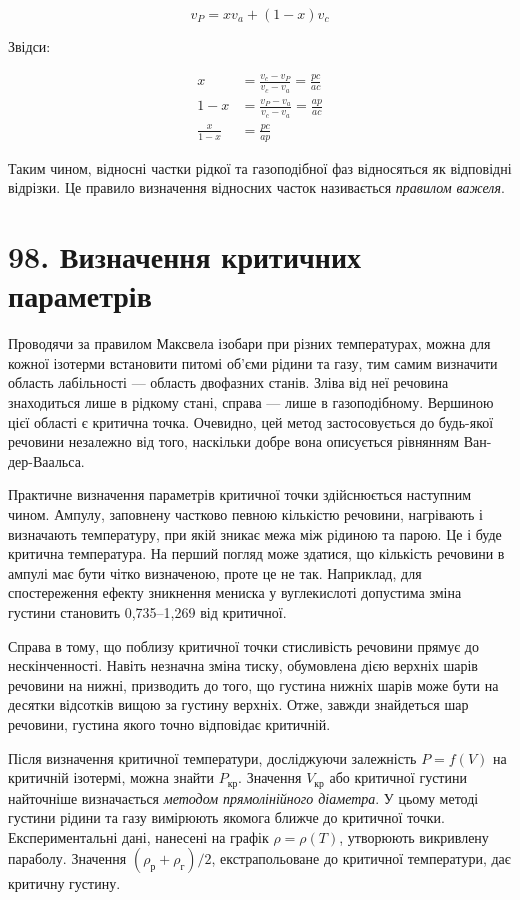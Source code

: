 \documentclass{article}
\begin{document}
\begin{equation}
v_P = x v_a + (1 - x) v_c
\label{eq:97.1}
\end{equation}

Звідси:

\begin{align}
x &= \frac{v_c - v_P}{v_c - v_a} = \frac{pc}{ac} \label{eq:97.2} \\
1 - x &= \frac{v_P - v_a}{v_c - v_a} = \frac{ap}{ac} \label{eq:97.3} \\
\frac{x}{1 - x} &= \frac{pc}{ap} \label{eq:97.4}
\end{align}

Таким чином, відносні частки рідкої та газоподібної фаз відносяться як відповідні відрізки. Це правило
визначення відносних часток називається \emph{правилом важеля}.


\section*{98. Визначення критичних параметрів}

Проводячи за правилом Максвела ізобари при різних температурах, можна для кожної ізотерми встановити
питомі об'єми рідини та газу, тим самим визначити область лабільності — область двофазних станів.
Зліва від неї речовина знаходиться лише в рідкому стані, справа — лише в газоподібному. Вершиною цієї
області є критична точка. Очевидно, цей метод застосовується до будь-якої речовини незалежно від того,
наскільки добре вона описується рівнянням Ван-дер-Ваальса.

Практичне визначення параметрів критичної точки здійснюється наступним чином. Ампулу, заповнену
частково певною кількістю речовини, нагрівають і визначають температуру, при якій зникає межа між
рідиною та парою. Це і буде критична температура. На перший погляд може здатися, що кількість речовини
в ампулі має бути чітко визначеною, проте це не так. Наприклад, для спостереження ефекту зникнення
мениска у вуглекислоті допустима зміна густини становить 0,735–1,269 від критичної.

Справа в тому, що поблизу критичної точки стисливість речовини прямує до нескінченності. Навіть
незначна зміна тиску, обумовлена дією верхніх шарів речовини на нижні, призводить до того, що густина
нижніх шарів може бути на десятки відсотків вищою за густину верхніх. Отже, завжди знайдеться шар
речовини, густина якого точно відповідає критичній.

Після визначення критичної температури, досліджуючи залежність $P = f(V)$ на критичній ізотермі, можна
знайти $P_{\text{кр}}$. Значення $V_{\text{кр}}$ або критичної густини найточніше визначається
\emph{методом прямолінійного діаметра}. У цьому методі густини рідини та газу вимірюють якомога ближче
до критичної точки. Експериментальні дані, нанесені на графік $\rho = \rho(T)$, утворюють викривлену
параболу. Значення $(\rho_{\text{р}} + \rho_{\text{г}})/2$, екстрапольоване до критичної температури,
дає критичну густину.
\end{document}
